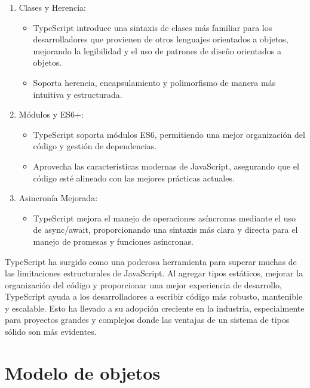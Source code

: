 \documentclass{article}
\begin{document}
\begin{enumerate}
      \item Clases y Herencia:
            \begin{itemize}
                  \item TypeScript introduce una sintaxis de clases más familiar para los desarrolladores que provienen
                        de otros lenguajes orientados a objetos, mejorando la legibilidad y el uso de patrones de diseño
                        orientados a objetos.
                  \item  Soporta herencia, encapsulamiento y polimorfismo de manera más intuitiva y estructurada.
            \end{itemize}
      \item Módulos y ES6+:
            \begin{itemize}
                  \item TypeScript soporta módulos ES6, permitiendo una mejor organización del código y gestión de
                        dependencias.
                  \item Aprovecha las características modernas de JavaScript, asegurando que el código esté alineado con
                        las mejores prácticas actuales.
            \end{itemize}
      \item Asincronía Mejorada:
            \begin{itemize}
                  \item TypeScript mejora el manejo de operaciones asíncronas mediante el uso de async/await,
                        proporcionando una sintaxis más clara y directa para el manejo de promesas y funciones asíncronas.
            \end{itemize}
\end{enumerate}

TypeScript ha surgido como una poderosa herramienta para superar muchas de las limitaciones estructurales de
JavaScript. Al agregar tipos estáticos, mejorar la organización del código y proporcionar una mejor experiencia
de desarrollo, TypeScript ayuda a los desarrolladores a escribir código más robusto, mantenible y escalable. Esto
ha llevado a su adopción creciente en la industria, especialmente para proyectos grandes y complejos donde las
ventajas de un sistema de tipos sólido son más evidentes.

\section{Modelo de objetos}
\end{document}

